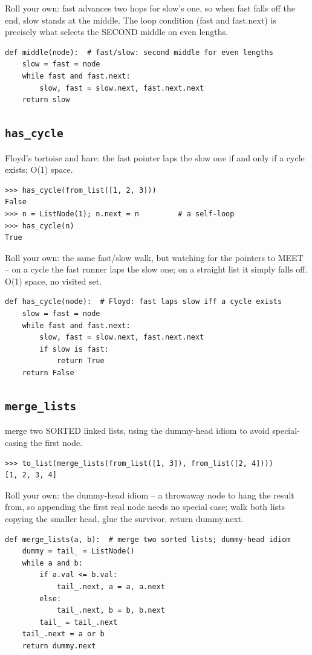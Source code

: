 \documentclass[10pt,letterpaper]{book}
\begin{document}
Roll your own: fast advances two hops for slow's one, so when fast falls off the end, slow stands at the middle. The loop condition (fast and fast.next) is precisely what selects the SECOND middle on even lengths.

\begin{lstlisting}[style=ex]
def middle(node):  # fast/slow: second middle for even lengths
    slow = fast = node
    while fast and fast.next:
        slow, fast = slow.next, fast.next.next
    return slow
\end{lstlisting}
\subsection{\texttt{has\_cycle}}\label{def:has-cycle}
Floyd's tortoise and hare: the fast pointer laps the slow one if and only if a cycle exists; O(1) space.
\begin{lstlisting}[style=ex]
>>> has_cycle(from_list([1, 2, 3]))
False
>>> n = ListNode(1); n.next = n         # a self-loop
>>> has_cycle(n)
True
\end{lstlisting}

Roll your own: the same fast/slow walk, but watching for the pointers to MEET -- on a cycle the fast runner laps the slow one; on a straight list it simply falls off. O(1) space, no visited set.

\begin{lstlisting}[style=ex]
def has_cycle(node):  # Floyd: fast laps slow iff a cycle exists
    slow = fast = node
    while fast and fast.next:
        slow, fast = slow.next, fast.next.next
        if slow is fast:
            return True
    return False
\end{lstlisting}
\subsection{\texttt{merge\_lists}}\label{def:merge-lists}
merge two SORTED linked lists, using the dummy-head idiom to avoid special-casing the first node.
\begin{lstlisting}[style=ex]
>>> to_list(merge_lists(from_list([1, 3]), from_list([2, 4])))
[1, 2, 3, 4]
\end{lstlisting}

Roll your own: the dummy-head idiom -- a throwaway node to hang the result from, so appending the first real node needs no special case; walk both lists copying the smaller head, glue the survivor, return dummy.next.

\begin{lstlisting}[style=ex]
def merge_lists(a, b):  # merge two sorted lists; dummy-head idiom
    dummy = tail_ = ListNode()
    while a and b:
        if a.val <= b.val:
            tail_.next, a = a, a.next
        else:
            tail_.next, b = b, b.next
        tail_ = tail_.next
    tail_.next = a or b
    return dummy.next
\end{lstlisting}
\end{document}
